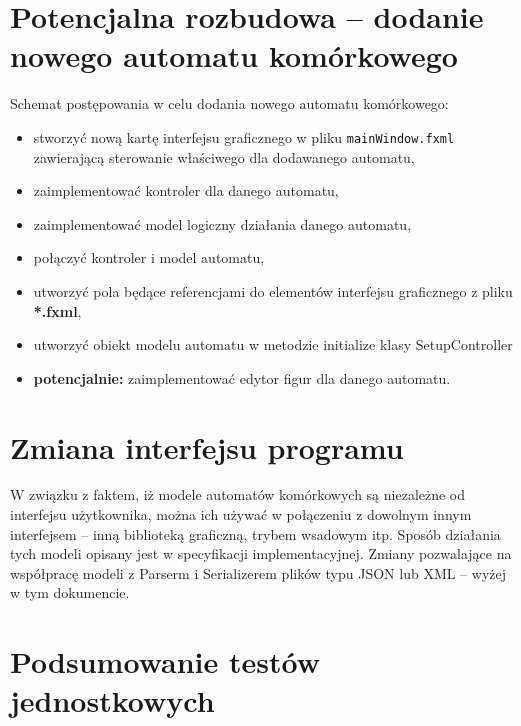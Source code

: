 \documentclass{mwart}
\begin{document}
\section{Potencjalna rozbudowa -- dodanie nowego automatu komórkowego}
Schemat postępowania w celu dodania nowego automatu komórkowego:
\begin{itemize}
	\item stworzyć nową kartę interfejsu graficznego w pliku \texttt{mainWindow.fxml} zawierającą sterowanie właściwego dla dodawanego automatu,
	\item zaimplementować kontroler dla danego automatu,
	\item zaimplementować model logiczny działania danego automatu,
	\item połączyć kontroler i model automatu,
	\item utworzyć pola będące referencjami do elementów interfejsu graficznego z pliku \textbf{*.fxml}, 
	\item utworzyć obiekt modelu automatu w metodzie initialize klasy SetupController
	\item \textbf{potencjalnie: } zaimplementować edytor figur dla danego automatu.
\end{itemize}

\section{Zmiana interfejsu programu}
W związku z faktem, iż modele automatów komórkowych są niezależne od interfejsu użytkownika, można ich używać w połączeniu z dowolnym innym interfejsem -- inną biblioteką graficzną, trybem wsadowym itp. Sposób działania tych modeli opisany jest w specyfikacji implementacyjnej. Zmiany pozwalające na współpracę modeli z Parserm i Serializerem plików typu JSON lub XML -- wyżej w tym dokumencie.

\section{Podsumowanie testów jednostkowych}
\end{document}
